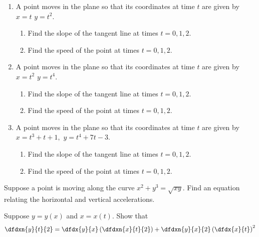 \begin{ProblemSection}
  \begin{embeddedproblem}{}
    \begin{enumerate}[label={\bf{}(\alph*)}]
    \item A point moves in the plane so that its coordinates at time
      $t$ are given by $x=t$ $y=t^2.$
      \begin{enumerate}[label={\bf{}(\roman*)}]
      \item Find the slope of the tangent line at times $t=0, 1, 2.$
      \item Find the speed of the point at times $t=0,1,2.$
      \end{enumerate}
    \item A point moves in the plane so that its coordinates at time
      $t$ are given by $x=t^2$ $y=t^4.$
      \begin{enumerate}[label={\bf{}(\roman*)}]
      \item Find the slope of the tangent line at times $t=0, 1, 2.$
      \item Find the speed of the point at times $t=0,1,2.$
      \end{enumerate}
    \item A point moves in the plane so that its coordinates at time
      $t$ are given by $x=t^3+t+1,$ $y=t^4+7t-3.$
      \begin{enumerate}[label={\bf{}(\roman*)}]
      \item Find the slope of the tangent line at times $t=0, 1, 2.$
      \item Find the speed of the point at times $t=0,1,2.$
      \end{enumerate}
    \end{enumerate}
  \end{embeddedproblem}


  \begin{embeddedproblem}
    Suppose a point is moving along the curve $x^2+y^3=\sqrt{xy}$.
    Find an equation relating the horizontal and vertical
    accelerations.
  \end{embeddedproblem}
  

  \begin{embeddedproblem}{}
    Suppose $y=y(x)$ and $x=x(t).$ Show that
    $$
    \dfdxn{y}{t}{2}=\dfdx{y}{x} \left( \dfdxn{x}{t}{2} \right)
    +\dfdxn{y}{x}{2} \left( \dfdx{x}{t} \right)^2
    $$
  \end{embeddedproblem}


\end{ProblemSection}
